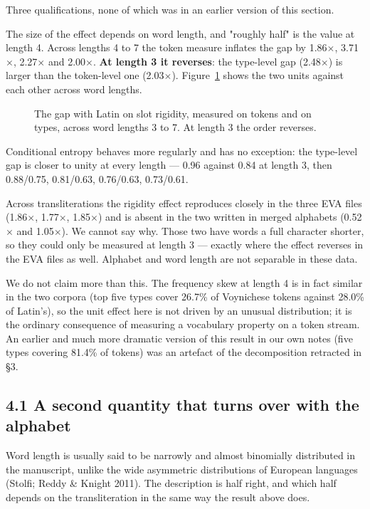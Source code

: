 \documentclass[11pt,a4paper]{article}
\begin{document}
Three qualifications, none of which was in an earlier version of this section.


The size of the effect depends on word length, and "roughly half" is the value at length 4. Across lengths 4 to 7 the token measure inflates the gap by 1.86$\times$, 3.71$\times$, 2.27$\times$ and 2.00$\times$. \textbf{At length 3 it reverses}: the type-level gap (2.48$\times$) is larger than the token-level one (2.03$\times$). Figure~\ref{fig:2} shows the two units against each other across word lengths.


\begin{figure}[htbp]\centering

\caption{The gap with Latin on slot rigidity, measured on tokens and on types, across word lengths 3 to 7. At length 3 the order reverses.}
\label{fig:2}
\end{figure}

Conditional entropy behaves more regularly and has no exception: the type-level gap is closer to unity at every length --- 0.96 against 0.84 at length 3, then 0.88/0.75, 0.81/0.63, 0.76/0.63, 0.73/0.61.


Across transliterations the rigidity effect reproduces closely in the three EVA files (1.86$\times$, 1.77$\times$, 1.85$\times$) and is absent in the two written in merged alphabets (0.52$\times$ and 1.05$\times$). We cannot say why. Those two have words a full character shorter, so they could only be measured at length 3 --- exactly where the effect reverses in the EVA files as well. Alphabet and word length are not separable in these data.


We do not claim more than this. The frequency skew at length 4 is in fact similar in the two corpora (top five types cover 26.7\% of Voynichese tokens against 28.0\% of Latin's), so the unit effect here is not driven by an unusual distribution; it is the ordinary consequence of measuring a vocabulary property on a token stream. An earlier and much more dramatic version of this result in our own notes (five types covering 81.4\% of tokens) was an artefact of the decomposition retracted in \S3.


\subsection*{4.1 A second quantity that turns over with the alphabet}


Word length is usually said to be narrowly and almost binomially distributed in the manuscript, unlike the wide asymmetric distributions of European languages (Stolfi; Reddy \& Knight 2011). The description is half right, and which half depends on the transliteration in the same way the result above does.
\end{document}
